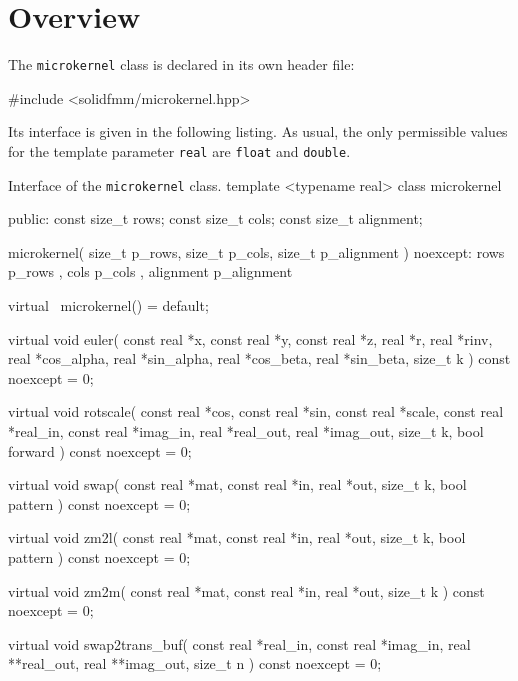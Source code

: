 \documentclass{scrbook}
\begin{document}
\section{Overview}
The \lstinline|microkernel| class is declared in its own header file:
\begin{cppcode*}
#include <solidfmm/microkernel.hpp>
\end{cppcode*}

Its interface is given in the following listing. As usual, the only permissible
values for the template parameter \lstinline|real| are
\lstinline[style=cpp]|float| and \lstinline[style=cpp]|double|.

\begin{cppcode}{Interface of the \lstinline|microkernel| class.}
template <typename real>
class microkernel
{
public:
    const size_t rows;
    const size_t cols;
    const size_t alignment;

    microkernel( size_t p_rows, size_t p_cols, size_t p_alignment ) noexcept:
    rows { p_rows }, cols { p_cols }, alignment { p_alignment } {}

    virtual ~microkernel() = default;

    virtual void euler( const real *x,   const real *y, const real *z,
                              real *r,         real *rinv,
                              real *cos_alpha, real *sin_alpha,
                              real *cos_beta,  real *sin_beta,
                        size_t k ) const noexcept = 0;

    virtual void rotscale( const real *cos, const real *sin, const real *scale,
                           const real *real_in,  const real *imag_in,
                                 real *real_out,       real *imag_out,
                           size_t k, bool forward ) const noexcept = 0;

    virtual void swap( const real *mat, const real *in,
                       real *out, size_t k, bool pattern ) const noexcept = 0;

    virtual void zm2l( const real *mat, const real *in, 
                       real *out, size_t k, bool pattern ) const noexcept = 0;

    virtual void zm2m( const real *mat, const real *in,
                       real *out, size_t k ) const noexcept = 0;
    
    virtual void swap2trans_buf( const real  *real_in,  const real  *imag_in,
                                       real **real_out,       real **imag_out,
                                 size_t n ) const noexcept = 0;

}
\end{cppcode}
\end{document}
